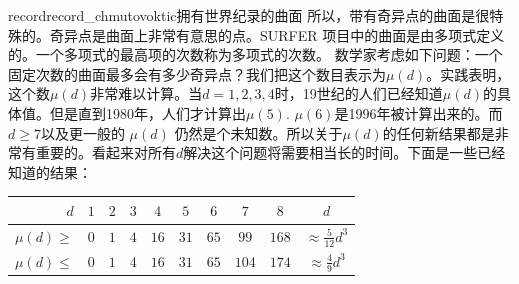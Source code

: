 \begin{surferIntroPage}{record}{record_chmutovoktic}{拥有世界纪录的曲面}
所以，带有奇异点的曲面是很特殊的。奇异点是曲面上非常有意思的点。SURFER 项目中的曲面是由多项式定义的。一个多项式的最高项的次数称为多项式的次数。
数学家考虑如下问题：一个固定次数的曲面最多会有多少奇异点？我们把这个数目表示为$\mu(d)$。实践表明，这个数$\mu(d)$非常难以计算。当$d=1,2,3,4$时，19世纪的人们已经知道$\mu(d)$的具体值。但是直到1980年，人们才计算出$\mu(5)$.
$\mu(6)$是1996年被计算出来的。而 $d\ge 7$以及更一般的 $\mu(d)$ 仍然是个未知数。所以关于$\mu(d)$的任何新结果都是非常有重要的。看起来对所有$d$解决这个问题将需要相当长的时间。下面是一些已经知道的结果：
   \begin{center}
      \begin{tabular}{r|cccccccc|c}
        $d$ & $1$ & $2$ & $3$ & $4$ & $5$ & $6$ & $7$ & $8$ & $d$\\
        \hline
        \hline
        \rule{0pt}{1.2em}$\mu(d)\ge$ & $0$ & $1$ & $4$ & $16$ & $31$ & $65$ &
        $99$ & $168$ &
        $\approx \frac{5}{12}d^3$\\[0.3em]
        \hline
        \rule{0pt}{1.2em}$\mu(d)\le$ & $0$ & $1$ & $4$ & $16$ & $31$ & $65$ &
        $104$ & $174$ & $\approx \frac{4}{9}d^3$
      \end{tabular}
    \end{center}
\end{surferIntroPage}
